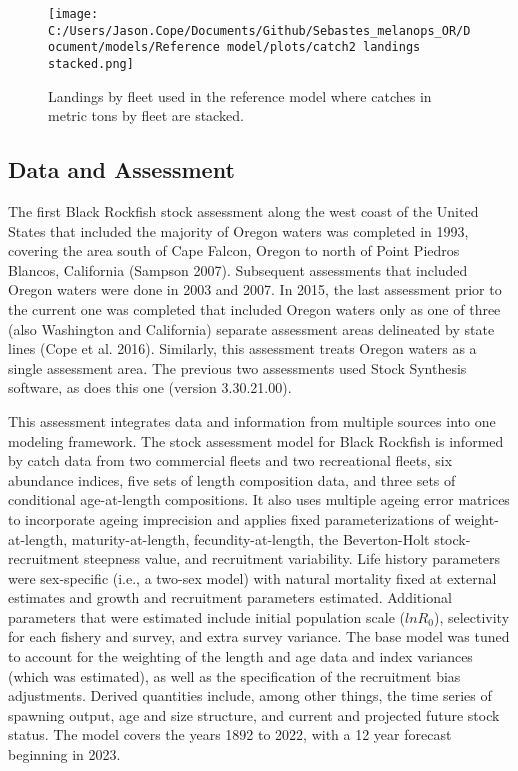 \documentclass[11pt,
  english,
  letterpaper,
]{article}
\begin{document}


\begin{figure}
\centering
\texttt{[image: C:/Users/Jason.Cope/Documents/Github/Sebastes\_melanops\_OR/Document/models/Reference model/plots/catch2 landings stacked.png]}
\caption{Landings by fleet used in the reference model where catches in metric tons by fleet are stacked.\label{fig:es-catch}}
\end{figure}

\clearpage

\hypertarget{data-and-assessment}{%
\subsection*{Data and Assessment}\label{data-and-assessment}}

The first Black Rockfish stock assessment along the west coast of the United States that included the majority of Oregon waters was completed in 1993, covering the area south of Cape Falcon, Oregon to north of Point Piedros Blancos, California (Sampson 2007). Subsequent assessments that included Oregon waters were done in 2003 and 2007. In 2015, the last assessment prior to the current one was completed that included Oregon waters only as one of three (also Washington and California) separate assessment areas delineated by state lines (Cope et al. 2016). Similarly, this assessment treats Oregon waters as a single assessment area. The previous two assessments used Stock Synthesis software, as does this one (version 3.30.21.00).

This assessment integrates data and information from multiple sources into one modeling framework. The stock assessment model for Black Rockfish is informed by catch data from two commercial fleets and two recreational fleets, six abundance indices, five sets of length composition data, and three sets of conditional age-at-length compositions. It also uses multiple ageing error matrices to incorporate ageing imprecision and applies fixed parameterizations of weight-at-length, maturity-at-length, fecundity-at-length, the Beverton-Holt stock-recruitment steepness value, and recruitment variability. Life history parameters were sex-specific (i.e., a two-sex model) with natural mortality fixed at external estimates and growth and recruitment parameters estimated. Additional parameters that were estimated include initial population scale (\(lnR_0\)), selectivity for each fishery and survey, and extra survey variance. The base model was tuned to account for the weighting of the length and age data and index variances (which was estimated), as well as the specification of the recruitment bias adjustments. Derived quantities include, among other things, the time series of spawning output, age and size structure, and current and projected future stock status. The model covers the years 1892 to 2022, with a 12 year forecast beginning in 2023.
\end{document}
